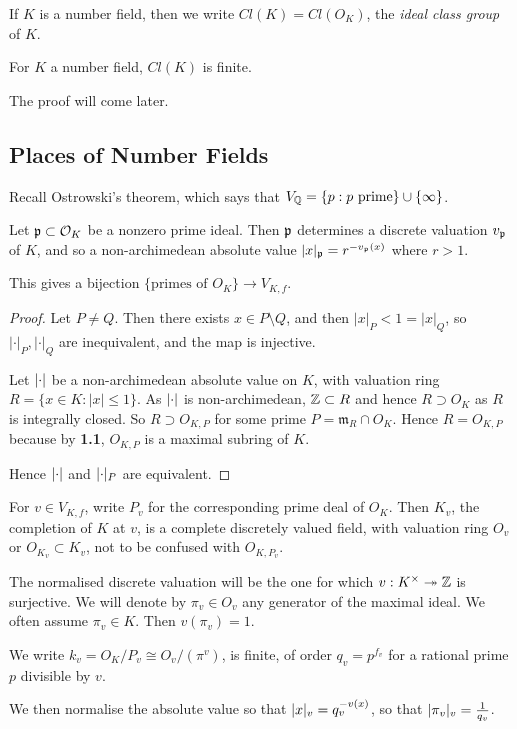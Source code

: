 \documentclass[10pt,a4paper]{article}
\begin{document}
If $K$ is a number field, then we write $Cl(K) = Cl(O_K)$, the \emph{ideal class group} of $K$.
\begin{theorem}
  For $K$ a number field, $Cl(K)$ is finite.
\end{theorem}
The proof will come later.

\subsection{Places of Number Fields}
Recall Ostrowski's theorem, which says that $V_{\mathbb{Q}} = \{p:p\text{ prime}\}\cup\{\infty\}$.

Let $\mathfrak{p} \subset \mathcal{O}_K$ be a nonzero prime ideal. Then $\mathfrak{p}$ determines a discrete valuation $v_{\mathfrak{p}}$ of $K$, and so a non-archimedean absolute value $\lvert x\rvert_{\mathfrak{p}} = r^{-v_{\mathfrak{p}}(x)}$ where $r>1$.
\begin{theorem}
  This gives a bijection $\{\text{primes of $O_K$}\} \to V_{K,f}$.
\end{theorem}
\begin{proof}
  Let $P\neq Q$. Then there exists $x \in P \setminus Q$, and then $|x|_P < 1 = |x|_Q$, so $|\cdot|_P, |\cdot|_Q$ are inequivalent, and the map is injective.

  Let $\lvert\cdot\rvert$ be a non-archimedean absolute value on $K$, with valuation ring $R = \{x \in K : |x|\leq 1\}$. As $\lvert\cdot\rvert$ is non-archimedean, $\mathbb{Z}\subset R$ and hence $R \supset O_K$ as $R$ is integrally closed. So $R \supset O_{K,P}$ for some prime $P = \mathfrak{m}_R \cap O_K$. Hence $R = O_{K,P}$ because by \textbf{1.1}, $O_{K,P}$ is a maximal subring of $K$.

  Hence $\lvert\cdot\rvert$ and $\lvert\cdot\rvert_P$ are equivalent.
\end{proof}
For $v \in V_{K,f}$, write $P_v$ for the corresponding prime deal of $O_K$. Then $K_v$, the completion of $K$ at $v$, is a complete discretely valued field, with valuation ring $O_v$ or $O_{K_v} \subset K_v$, not to be confused with $O_{K,P_v}$.

The normalised discrete valuation will be the one for which $v:K^\times \twoheadrightarrow \mathbb{Z}$ is surjective. We will denote by $\pi_v \in O_v$ any generator of the maximal ideal. We often assume $\pi_v \in K$. Then $v(\pi_v) = 1$.

We write $k_v = O_K/P_v \cong O_v/(\pi^v)$, is finite, of order $q_v = p^{f_v}$ for a rational prime $p$ divisible by $v$.

We then normalise the absolute value so that $\lvert x\rvert_{v} = q_v^{-v(x)}$, so that $\lvert\pi_v\rvert_v = \frac{1}{q_v}$.
\end{document}
